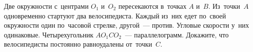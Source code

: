 \begin{problems}
\item
Две окружности с~центрами $O_1$ и~$O_2$ пересекаются в~точках $A$ и~$B$.
Из~точки~$A$ одновременно стартуют два велосипедиста.
Каждый из~них едет по~своей окружности один по~часовой стрелке, другой~---
против.
Угловые скорости у~них одинаковые.
Четырехугольник $A O_1 C O_2$~--- параллелограмм.
Докажите, что велосипедисты постоянно равноудалены от~точки~$C$.

\end{problems}

